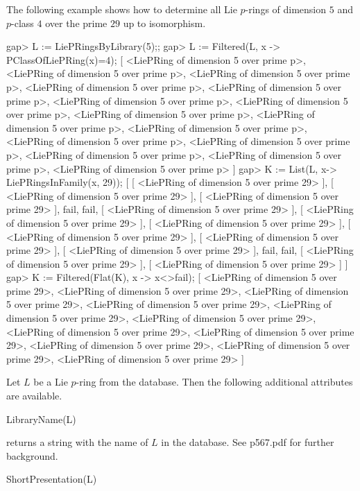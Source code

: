 The following example shows how to determine all Lie $p$-rings of dimension
$5$ and $p$-class $4$ over the prime $29$ up to isomorphism.

\beginexample
gap> L := LiePRingsByLibrary(5);;
gap> L := Filtered(L, x -> PClassOfLiePRing(x)=4);
[ <LiePRing of dimension 5 over prime p>, 
  <LiePRing of dimension 5 over prime p>, 
  <LiePRing of dimension 5 over prime p>, 
  <LiePRing of dimension 5 over prime p>, 
  <LiePRing of dimension 5 over prime p>, 
  <LiePRing of dimension 5 over prime p>, 
  <LiePRing of dimension 5 over prime p>, 
  <LiePRing of dimension 5 over prime p>, 
  <LiePRing of dimension 5 over prime p>, 
  <LiePRing of dimension 5 over prime p>, 
  <LiePRing of dimension 5 over prime p>, 
  <LiePRing of dimension 5 over prime p>, 
  <LiePRing of dimension 5 over prime p>, 
  <LiePRing of dimension 5 over prime p>, 
  <LiePRing of dimension 5 over prime p> ]
gap> K := List(L, x-> LiePRingsInFamily(x, 29));
[ [ <LiePRing of dimension 5 over prime 29> ], 
  [ <LiePRing of dimension 5 over prime 29> ], 
  [ <LiePRing of dimension 5 over prime 29> ], fail, fail, 
  [ <LiePRing of dimension 5 over prime 29> ], 
  [ <LiePRing of dimension 5 over prime 29> ], 
  [ <LiePRing of dimension 5 over prime 29> ], 
  [ <LiePRing of dimension 5 over prime 29> ], 
  [ <LiePRing of dimension 5 over prime 29> ], 
  [ <LiePRing of dimension 5 over prime 29> ], fail, fail, 
  [ <LiePRing of dimension 5 over prime 29> ], 
  [ <LiePRing of dimension 5 over prime 29> ] ]
gap> K := Filtered(Flat(K), x -> x<>fail);
[ <LiePRing of dimension 5 over prime 29>, 
  <LiePRing of dimension 5 over prime 29>, 
  <LiePRing of dimension 5 over prime 29>, 
  <LiePRing of dimension 5 over prime 29>, 
  <LiePRing of dimension 5 over prime 29>, 
  <LiePRing of dimension 5 over prime 29>, 
  <LiePRing of dimension 5 over prime 29>, 
  <LiePRing of dimension 5 over prime 29>, 
  <LiePRing of dimension 5 over prime 29>, 
  <LiePRing of dimension 5 over prime 29>, 
  <LiePRing of dimension 5 over prime 29> ]
\endexample


Let $L$ be a Lie $p$-ring from the database. Then the following additional
attributes are available. 

\> LibraryName(L)

returns a string with the name of $L$ in the database. See p567.pdf for
further background.

\> ShortPresentation(L)


